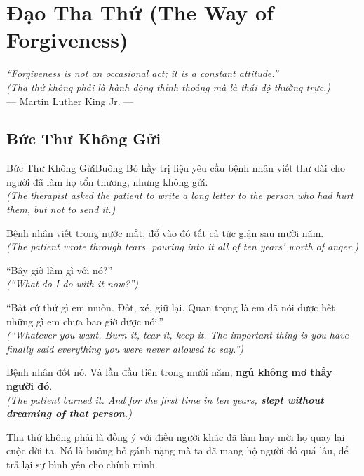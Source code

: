 \chapter{Đạo Tha Thứ (The Way of Forgiveness)}

\begin{center}
  \textit{\color{truyenblue}``Forgiveness is not an occasional act; it is a constant attitude.''}\\
  \textit{(Tha thứ không phải là hành động thỉnh thoảng mà là thái độ thường trực.)}\\[4pt]
  \small\color{truyengold}--- Martin Luther King Jr. ---
\end{center}
\ngancach

\section{Bức Thư Không Gửi}
\begin{truyen}{Bức Thư Không Gửi}{Buông Bỏ}
hầy trị liệu yêu cầu bệnh nhân viết thư dài cho người đã làm họ tổn thương, nhưng không gửi.\\
\textit{(The therapist asked the patient to write a long letter to the person who had hurt them, but not to send it.)}

Bệnh nhân viết trong nước mắt, đổ vào đó tất cả tức giận sau mười năm.\\
\textit{(The patient wrote through tears, pouring into it all of ten years' worth of anger.)}

``Bây giờ làm gì với nó?''\\
\textit{(``What do I do with it now?'')}

``Bất cứ thứ gì em muốn. Đốt, xé, giữ lại. Quan trọng là em đã nói được hết những gì em chưa bao giờ được nói.''\\
\textit{(``Whatever you want. Burn it, tear it, keep it. The important thing is you have finally said everything you were never allowed to say.'')}

Bệnh nhân đốt nó. Và lần đầu tiên trong mười năm, \textbf{ngủ không mơ thấy người đó}.\\
\textit{(The patient burned it. And for the first time in ten years, \textbf{slept without dreaming of that person}.)}
\end{truyen}
\begin{baihoc}
  Tha thứ không phải là đồng ý với điều người khác đã làm hay mời họ quay lại cuộc đời ta. Nó là buông bỏ gánh nặng mà ta đã mang hộ người đó quá lâu, để trả lại sự bình yên cho chính mình.
\end{baihoc}

